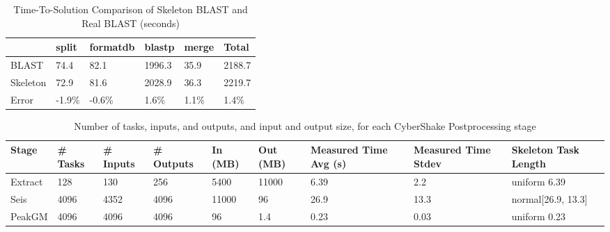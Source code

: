 \documentclass[preprint,12pt]{elsarticle}
\begin{document}

\begin{table}[t]
\begin{center}
    \caption{Time-To-Solution Comparison of Skeleton BLAST and Real BLAST (seconds)}
    \begin{scriptsize}
    \begin{tabular}{ | p{1cm} | p{1cm} |p{1cm} | p{1cm} | p{1.2cm} | p{1cm} | }
    \hline
	& split & formatdb & blastp & merge & Total \\ \hline \hline
	BLAST & 74.4 & 82.1 & 1996.3 & 35.9 & 2188.7 \\ \hline
	Skeleton & 72.9 & 81.6 & 2028.9 & 36.3 & 2219.7 \\ \hline
	Error & -1.9\% & -0.6\% & 1.6\% & 1.1\% & 1.4\% \\ \hline
    \end{tabular}
    \end{scriptsize}
    \label{tb:blast-results}
\end{center}   
\end{table}

\begin{table}[t]
\begin{center}
    \caption{Number of tasks, inputs, and outputs, and input and output size, for each CyberShake Postprocessing stage}
    \begin{scriptsize}
    \begin{tabular}{ | p{1.25cm} | p{0.6cm} | p{0.65cm} | p{0.75cm} | p{0.85cm} | p{0.85cm} | p{1.2cm} | p{1.2cm} | p{2.5cm} |}
    \hline
    Stage & \# Tasks & \# Inputs & \# Outputs & In (MB) & Out (MB) & Measured Time Avg (s) & Measured Time Stdev & Skeleton Task Length\\ \hline \hline
	Extract & 128 & 130 & 256 & 5400 & 11000 & 6.39 & 2.2 & uniform 6.39\\ \hline
	Seis & 4096 & 4352 & 4096 & 11000 & 96 & 26.9 & 13.3 & normal[26.9, 13.3]\\ \hline
	PeakGM & 4096 & 4096 & 4096 & 96 & 1.4 & 0.23 & 0.03 & uniform 0.23\\ \hline
    \end{tabular}
    \end{scriptsize}
    \label{tb:cybershake-stats}
\end{center}   
\end{table}
\end{document}
